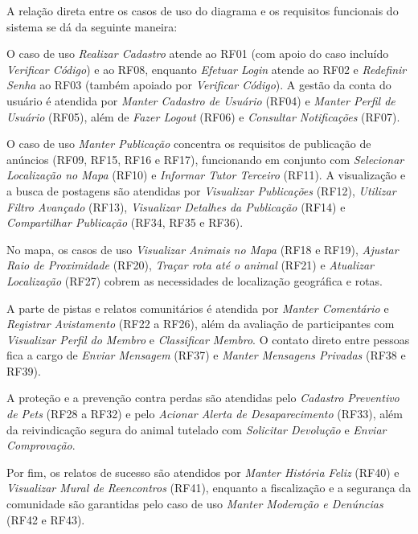 \enlargethispage{3\baselineskip}
A relação direta entre os casos de uso do diagrama e os requisitos funcionais do sistema se dá da seguinte maneira:

O caso de uso \textit{Realizar Cadastro} atende ao RF01 (com apoio do caso incluído \textit{Verificar Código}) e ao RF08, enquanto \textit{Efetuar Login} atende ao RF02 e \textit{Redefinir Senha} ao RF03 (também apoiado por \textit{Verificar Código}). A gestão da conta do usuário é atendida por \textit{Manter Cadastro de Usuário} (RF04) e \textit{Manter Perfil de Usuário} (RF05), além de \textit{Fazer Logout} (RF06) e \textit{Consultar Notificações} (RF07).

O caso de uso \textit{Manter Publicação} concentra os requisitos de publicação de anúncios (RF09, RF15, RF16 e RF17), funcionando em conjunto com \textit{Selecionar Localização no Mapa} (RF10) e \textit{Informar Tutor Terceiro} (RF11). A visualização e a busca de postagens são atendidas por \textit{Visualizar Publicações} (RF12), \textit{Utilizar Filtro Avançado} (RF13), \textit{Visualizar Detalhes da Publicação} (RF14) e \textit{Compartilhar Publicação} (RF34, RF35 e RF36).

No mapa, os casos de uso \textit{Visualizar Animais no Mapa} (RF18 e RF19), \textit{Ajustar Raio de Proximidade} (RF20), \textit{Traçar rota até o animal} (RF21) e \textit{Atualizar Localização} (RF27) cobrem as necessidades de localização geográfica e rotas.

A parte de pistas e relatos comunitários é atendida por \textit{Manter Comentário} e \textit{Registrar Avistamento} (RF22 a RF26), além da avaliação de participantes com \textit{Visualizar Perfil do Membro} e \textit{Classificar Membro}. O contato direto entre pessoas fica a cargo de \textit{Enviar Mensagem} (RF37) e \textit{Manter Mensagens Privadas} (RF38 e RF39).

A proteção e a prevenção contra perdas são atendidas pelo \textit{Cadastro Preventivo de Pets} (RF28 a RF32) e pelo \textit{Acionar Alerta de Desaparecimento} (RF33), além da reivindicação segura do animal tutelado com \textit{Solicitar Devolução} e \textit{Enviar Comprovação}.

Por fim, os relatos de sucesso são atendidos por \textit{Manter História Feliz} (RF40) e \textit{Visualizar Mural de Reencontros} (RF41), enquanto a fiscalização e a segurança da comunidade são garantidas pelo caso de uso \textit{Manter Moderação e Denúncias} (RF42 e RF43).

\clearpage

